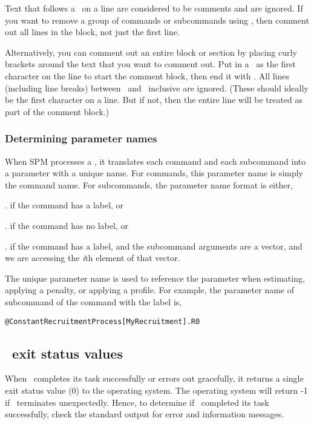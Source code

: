 Text that follows a \commentline\ on a line are considered to be comments and are ignored. If you want to remove a group of commands or subcommands using \commentline, then comment out all lines in the block, not just the first line. 

Alternatively, you can comment out an entire block or section by placing curly brackets around the text that you want to comment out. Put in a \commentstart\ as the first character on the line to start the comment block, then end it with \commentend. All lines (including line breaks) between \commentstart\ and \commentend\ inclusive are ignored. (These should ideally be the first character on a line. But if not, then the entire line will be treated as part of the comment block.)

\subsubsection{Determining parameter names}

When SPM processes a \config, it translates each command and each subcommand into a parameter with a unique name. For commands, this parameter name is simply the command name. For subcommands, the parameter name format is either, 

\begin{description}
\item {}\subcommand{[label]}. if the command has a label, or
\item {}. if the command has no label, or
\item {}\subcommand{[label]}.\subcommand{[i]} if the command has a label, and the subcommand arguments are a vector, and we are accessing the  \emph{i}th element of that vector. 
\end{description} 

The unique parameter name is used to reference the parameter when estimating, applying a penalty, or applying a profile. For example, the parameter name of subcommand  of the command  with the label  is,

\texttt{@ConstantRecruitmentProcess[MyRecruitment].R0}

\subsection{\SPM\ exit status values}

When \SPM\ completes its task successfully or errors out gracefully, it returns a single exit status value (0) to the operating system. The operating system will return -1 if \SPM\ terminates unexpectedly. Hence, to determine if \SPM\ completed its task successfully, check the standard output for error and information messages.
